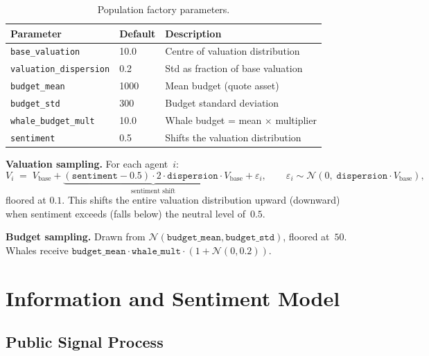 \documentclass[11pt,a4paper]{article}
\begin{document}
\begin{table}[h]
\centering
\caption{Population factory parameters.}
\label{tab:population}
\begin{tabular}{@{}llp{7cm}@{}}
\toprule
\textbf{Parameter} & \textbf{Default} & \textbf{Description} \\
\midrule
\texttt{base\_valuation}       & 10.0  & Centre of valuation distribution \\
\texttt{valuation\_dispersion} & 0.2   & Std as fraction of base valuation \\
\texttt{budget\_mean}          & 1000  & Mean budget (quote asset) \\
\texttt{budget\_std}           & 300   & Budget standard deviation \\
\texttt{whale\_budget\_mult}   & 10.0  & Whale budget = mean $\times$ multiplier \\
\texttt{sentiment}             & 0.5   & Shifts the valuation distribution \\
\bottomrule
\end{tabular}
\end{table}

\textbf{Valuation sampling.}  For each agent~$i$:
\begin{equation}\label{eq:valuation-sample}
  V_i \;=\; V_{\text{base}} + \underbrace{(\texttt{sentiment} - 0.5)\cdot 2\cdot \texttt{dispersion}\cdot V_{\text{base}}}_{\text{sentiment shift}} + \varepsilon_i, \qquad \varepsilon_i \sim \mathcal{N}(0,\;\texttt{dispersion}\cdot V_{\text{base}}),
\end{equation}
floored at $0.1$.  This shifts the entire valuation distribution upward (downward) when sentiment exceeds (falls below) the neutral level of~$0.5$.

\textbf{Budget sampling.}  Drawn from $\mathcal{N}(\texttt{budget\_mean}, \texttt{budget\_std})$, floored at~$50$.  Whales receive $\texttt{budget\_mean}\cdot\texttt{whale\_mult}\cdot(1 + \mathcal{N}(0,0.2))$.


\section{Information and Sentiment Model}
\label{sec:information}

\subsection{Public Signal Process}
\label{sec:public-signal}
\end{document}
